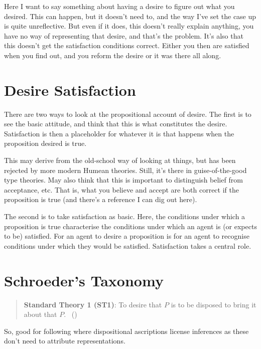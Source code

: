 \documentclass[10pt]{article}
\begin{document}
{\color{red}
  Here I want to say something about having a desire to figure out what you desired.
  This can happen, but it doesn't need to, and the way I've set the case up is quite unreflective.
  But even if it does, this doesn't really explain anything, you have no way of representing that desire, and that's the problem.
  It's also that this doesn't get the satisfaction conditions correct.
  Either you then are satisfied when you find out, and you reform the desire or it was there all along.
}

\section{Desire Satisfaction}
\label{sec:desire-satisfaction}

There are two ways to look at the propositional account of desire.
The first is to see the basic attitude, and think that this is what constitutes the desire.
Satisfaction is then a placeholder for whatever it is that happens when the proposition desired is true.

This may derive from the old-school way of looking at things, but has been rejected by more modern Humean theories.
Still, it's there in guise-of-the-good type theories.
May also think that this is important to distinguish belief from acceptance, etc.
That is, what you believe and accept are both correct if the proposition is true (and there's a reference I can dig out here).

The second is to take satisfaction as basic.
Here, the conditions under which a proposition is true characterise the conditions under which an agent is (or expects to be) satisfied.
For an agent to desire a proposition is for an agent to recognise conditions under which they would be satisfied.
Satisfaction takes a central role.



\section{Schroeder's Taxonomy}
\label{sec:schroeders-taxonomy}

\begin{quote}
  \textbf{Standard Theory 1 (ST1)}:
  To desire that \(P\) is to be disposed to bring it about that \(P\).\nolinebreak
  \mbox{ }\hfill(\citeyear[11]{Schroeder:2004aa})
\end{quote}

So, good for following \citeauthor{Ryle:1949aa} where dispositional ascriptions license inferences as these don't need to attribute representations.
\end{document}
